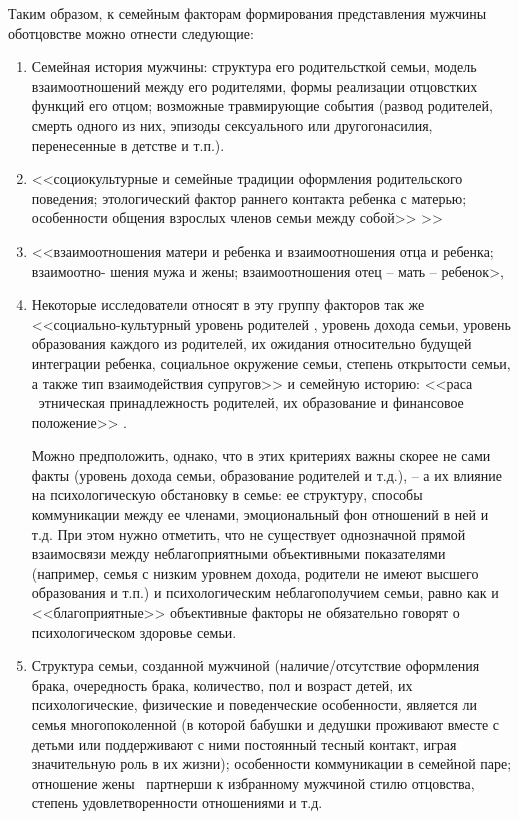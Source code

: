 \documentclass{../../common/thesisbyxetex}
\begin{document}
Таким образом, к семейным факторам формирования представления мужчины оботцовстве можно отнести
следующие:
\begin{enumerate}
	\item Семейная история мужчины: структура его родительсткой семьи,  модель взаимоотношений
между его родителями, формы реализации отцовстких функций его отцом; возможные травмирующие события
(развод родителей, смерть одного из них, эпизоды сексуального или другогонасилия, перенесенные в
детстве и т.п.).
\item <<социокультурные и семейные традиции оформления
родительского
поведения;
этологический фактор раннего контакта ребенка с матерью; особенности общения взрослых членов семьи
между собой>> \cite[16]{varga}>>

\item <<взаимоотношения матери и ребенка
и взаимоотношения отца и ребенка; взаимоотно-
шения мужа и жены; взаимоотношения отец –
мать – ребенок>, \cite[40]{otage}

\item Некоторые исследователи относят  в эту группу факторов так же <<социально-культурный уровень
родителей , уровень дохода семьи, уровень
образования каждого из родителей, их ожидания относительно будущей интеграции
ребенка, социальное окружение семьи, степень открытости семьи, а также тип
взаимодействия супругов>> \cite[286]{strat} и семейную историю: <<раса \ этническая принадлежность
родителей, их образование и финансовое положение>> \cite[164]{long}.

Можно предположить, однако, что в этих критериях важны скорее не сами факты (уровень дохода семьи,
образование родителей и т.д.), -- а их влияние на психологическую обстановку в семье: ее структуру,
способы коммуникации между ее членами, эмоциональный фон отношений в ней и т.д. При этом нужно
отметить, что не существует однозначной прямой взаимосвязи между неблагоприятными объективными
показателями (например, семья с низким уровнем дохода, родители не имеют высшего образования и
т.п.) и психологическим неблагополучием семьи, равно как и <<благоприятные>> объективные факторы не
 обязательно говорят о психологическом здоровье семьи.

 \item Структура семьи, созданной мужчиной (наличие/отсутствие оформления брака,
очередность брака, количество, пол и возраст детей, их психологические, физические и
поведенческие особенности, является ли семья многопоколенной (в которой бабушки и дедушки
проживают вместе с детьми или поддерживают с ними постоянный тесный контакт, играя
значительную роль в их жизни); особенности коммуникации в семейной паре; отношение жены \ партнерши
к избранному мужчиной стилю отцовства, степень удовлетворенности отношениями и т.д.


\end{enumerate}
\end{document}
